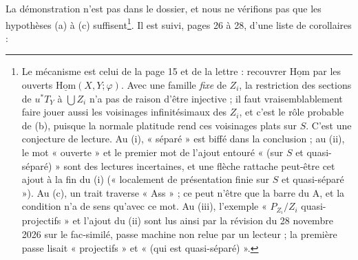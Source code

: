 \documentclass[11pt,a4paper]{article}
\begin{document}
La démonstration n'est pas dans le dossier, et nous ne vérifions pas que
les hypothèses (a) à (c) suffisent\footnote{Le mécanisme est celui de la
page 15 et de la lettre : recouvrer $\underline{\mathrm{Hom}}$ par les ouverts
$\underline{\mathrm{Hom}}(X,Y;\varphi)$. Avec une famille \emph{fixe} de $Z_i$, la
restriction des sections de $u^{*}T_Y$ à $\bigcup Z_i$ n'a pas de raison
d'être injective ; il faut vraisemblablement faire jouer aussi les voisinages
infinitésimaux des $Z_i$, et c'est le rôle probable de (b), puisque la normale
platitude rend ces voisinages plats sur $S$. C'est une conjecture de lecture.
Au (i), « séparé » est biffé dans la conclusion ; au (ii), le mot « ouverte »
et le premier mot de l'ajout entouré « (sur $S$ et quasi-séparé) » sont des
lectures incertaines, et une flèche rattache peut-être cet ajout à la fin du
(i) (« localement de présentation finie sur $S$ et quasi-séparé »). Au (c),
un trait traverse « Ass » ; ce peut n'être que la barre du A, et la condition
n'a de sens qu'avec ce mot. Au (iii), l'exemple « $P_{Z_i}/Z_i$
quasi-projectifs » et l'ajout du (ii) sont lus ainsi par la révision du 28 novembre 2026 sur le fac-similé, passe machine non relue par un lecteur ; la première
passe lisait « projectifs » et « (qui est quasi-séparé) ».}. Il
est suivi, pages 26 à 28, d'une liste de corollaires :
\end{document}
